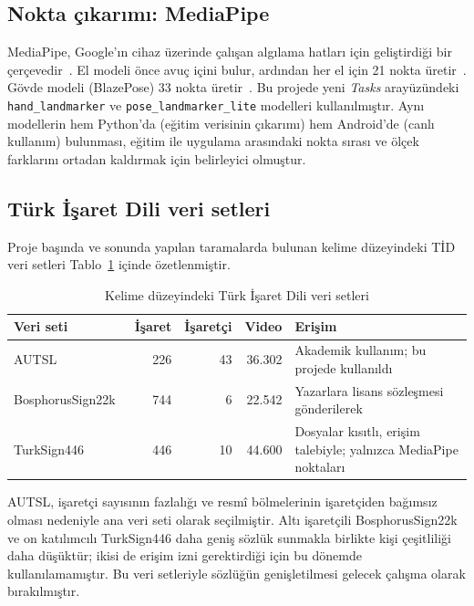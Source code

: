 \subsection{Nokta çıkarımı: MediaPipe}

MediaPipe, Google'ın cihaz üzerinde çalışan algılama hatları için geliştirdiği bir
çerçevedir~\cite{MediaPipe2019}. El modeli önce avuç içini bulur, ardından her el için
21 nokta üretir~\cite{MediaPipeHands2020}. Gövde modeli (BlazePose) 33 nokta
üretir~\cite{BlazePose2020}. Bu projede yeni \textit{Tasks} arayüzündeki
\texttt{hand\_landmarker} ve \texttt{pose\_landmarker\_lite} modelleri kullanılmıştır.
Aynı modellerin hem Python'da (eğitim verisinin çıkarımı) hem Android'de (canlı
kullanım) bulunması, eğitim ile uygulama arasındaki nokta sırası ve ölçek farklarını
ortadan kaldırmak için belirleyici olmuştur.

\subsection{Türk İşaret Dili veri setleri}

Proje başında ve sonunda yapılan taramalarda bulunan kelime düzeyindeki TİD veri
setleri Tablo~\ref{tab:verisetleri} içinde özetlenmiştir.

\begin{table}[H]
\centering
\caption{Kelime düzeyindeki Türk İşaret Dili veri setleri}
\label{tab:verisetleri}
\small
\begin{tabularx}{\textwidth}{@{}l r r r X@{}}
\toprule
\textbf{Veri seti} & \textbf{İşaret} & \textbf{İşaretçi} & \textbf{Video} & \textbf{Erişim} \\
\midrule
AUTSL~\cite{AUTSL2020} & 226 & 43 & 36.302 & Akademik kullanım; bu projede kullanıldı \\
BosphorusSign22k~\cite{Bosphorus2020} & 744 & 6 & 22.542 & Yazarlara lisans sözleşmesi gönderilerek \\
TurkSign446~\cite{TurkSign446} & 446 & 10 & 44.600 & Dosyalar kısıtlı, erişim talebiyle; yalnızca MediaPipe noktaları \\
\bottomrule
\end{tabularx}
\end{table}

AUTSL, işaretçi sayısının fazlalığı ve resmî bölmelerinin işaretçiden bağımsız olması
nedeniyle ana veri seti olarak seçilmiştir. Altı işaretçili BosphorusSign22k ve on
katılımcılı TurkSign446 daha geniş sözlük sunmakla birlikte kişi çeşitliliği daha
düşüktür; ikisi de erişim izni gerektirdiği için bu dönemde kullanılamamıştır. Bu veri
setleriyle sözlüğün genişletilmesi gelecek çalışma olarak bırakılmıştır.

